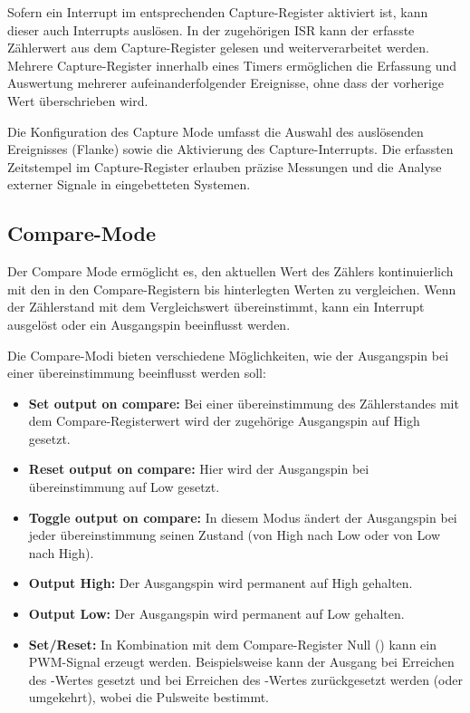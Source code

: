 Sofern ein Interrupt im entsprechenden Capture-Register aktiviert ist, kann dieser auch Interrupts ausl\"osen. In der zugeh\"origen ISR kann der erfasste Z\"ahlerwert aus dem Capture-Register gelesen und weiterverarbeitet werden. Mehrere Capture-Register innerhalb eines Timers erm\"oglichen die Erfassung und Auswertung mehrerer aufeinanderfolgender Ereignisse, ohne dass der vorherige Wert \"uberschrieben wird. 

Die Konfiguration des Capture Mode umfasst die Auswahl des ausl\"osenden Ereignisses (Flanke) sowie \ggf die Aktivierung des Capture-Interrupts. Die erfassten Zeitstempel im Capture-Register erlauben pr\"azise Messungen und die Analyse externer Signale in eingebetteten Systemen. 

\vspace{0.5cm}
\subsection{Compare-Mode}
\label{sec:Timer_CompareMode}

Der Compare Mode erm\"oglicht es, den aktuellen Wert des Z\"ahlers kontinuierlich mit den in den Compare-Registern  bis  hinterlegten Werten zu vergleichen. Wenn der Z\"ahlerstand mit dem Vergleichswert \"ubereinstimmt, kann \zB ein Interrupt ausgel\"ost oder ein Ausgangspin beeinflusst werden.

\newpage
Die Compare-Modi bieten verschiedene M\"oglichkeiten, wie der Ausgangspin bei einer \"ubereinstimmung beeinflusst werden soll:

\begin{itemize}
	\item \textbf{Set output on compare:} Bei einer \"ubereinstimmung des Z\"ahlerstandes mit dem Compare-Registerwert wird der zugeh\"orige Ausgangspin auf High gesetzt.

	\item \textbf{Reset output on compare:} Hier wird der Ausgangspin bei \"ubereinstimmung auf Low gesetzt.

	\item \textbf{Toggle output on compare:} In diesem Modus \"andert der Ausgangspin bei jeder \"ubereinstimmung seinen Zustand (von High nach Low oder von Low nach High).

	\item \textbf{Output High:} Der Ausgangspin wird permanent auf High gehalten.

	\item \textbf{Output Low:} Der Ausgangspin wird permanent auf Low gehalten.

	\item \textbf{Set/Reset:} In Kombination mit dem Compare-Register Null () kann ein PWM-Signal erzeugt werden. Beispielsweise kann der Ausgang bei Erreichen des -Wertes gesetzt und bei Erreichen des -Wertes zur\"uckgesetzt werden (oder umgekehrt), wobei  die Pulsweite bestimmt.
\end{itemize}

